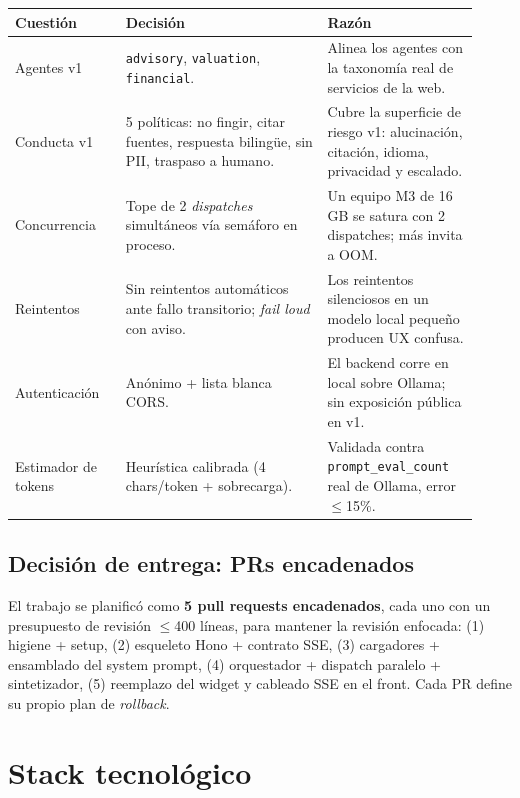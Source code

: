 \documentclass[11pt,a4paper]{article}
\newcommand{\code}[1]{\texttt{\small #1}}
\begin{document}
\begin{center}
\renewcommand{\arraystretch}{1.3}
\begin{tabular}{@{}p{0.22\linewidth}p{0.40\linewidth}p{0.30\linewidth}@{}}
\toprule
\textbf{Cuestión} & \textbf{Decisión} & \textbf{Razón} \\
\midrule
Agentes v1 &
\code{advisory}, \code{valuation}, \code{financial}. &
Alinea los agentes con la taxonomía real de servicios de la web. \\
Conducta v1 &
5 políticas: no fingir, citar fuentes, respuesta bilingüe, sin PII, traspaso a
humano. &
Cubre la superficie de riesgo v1: alucinación, citación, idioma, privacidad y
escalado. \\
Concurrencia &
Tope de 2 \emph{dispatches} simultáneos vía semáforo en proceso. &
Un equipo M3 de 16\,GB se satura con 2 dispatches; más invita a OOM. \\
Reintentos &
Sin reintentos automáticos ante fallo transitorio; \emph{fail loud} con aviso. &
Los reintentos silenciosos en un modelo local pequeño producen UX confusa. \\
Autenticación &
Anónimo + lista blanca CORS. &
El backend corre en local sobre Ollama; sin exposición pública en v1. \\
Estimador de tokens &
Heurística calibrada (4 chars/token + sobrecarga). &
Validada contra \code{prompt\_eval\_count} real de Ollama, error $\leq$15\%. \\
\bottomrule
\end{tabular}
\end{center}

\subsection{Decisión de entrega: PRs encadenados}

El trabajo se planificó como \textbf{5 pull requests encadenados}, cada uno
con un presupuesto de revisión $\leq$400 líneas, para mantener la revisión
enfocada: (1) higiene + setup, (2) esqueleto Hono + contrato SSE,
(3) cargadores + ensamblado del system prompt, (4) orquestador + dispatch
paralelo + sintetizador, (5) reemplazo del widget y cableado SSE en el front.
Cada PR define su propio plan de \emph{rollback}.

\section{Stack tecnológico}
\end{document}
